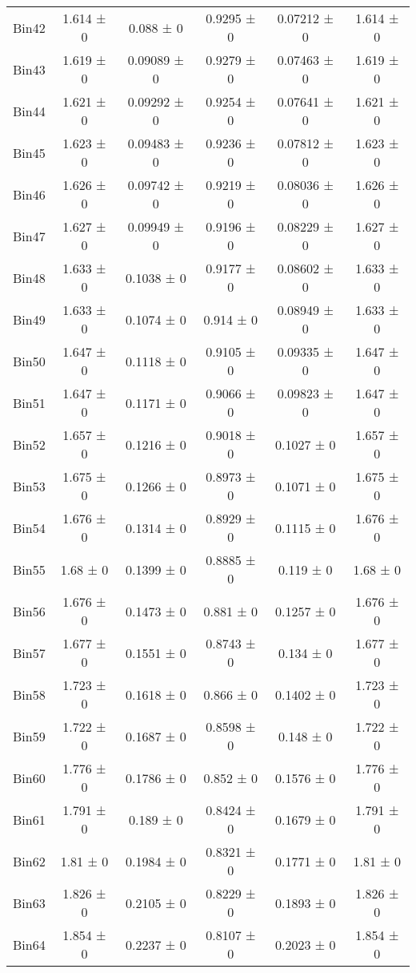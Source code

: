 \begin{tabular}{@{\extracolsep{4pt}}lccccc@{}}
     Bin42 & 1.614 ± 0 & 0.088 ± 0 & 0.9295 ± 0 & 0.07212 ± 0 & 1.614 ± 0 \\ 
     Bin43 & 1.619 ± 0 & 0.09089 ± 0 & 0.9279 ± 0 & 0.07463 ± 0 & 1.619 ± 0 \\ 
     Bin44 & 1.621 ± 0 & 0.09292 ± 0 & 0.9254 ± 0 & 0.07641 ± 0 & 1.621 ± 0 \\ 
     Bin45 & 1.623 ± 0 & 0.09483 ± 0 & 0.9236 ± 0 & 0.07812 ± 0 & 1.623 ± 0 \\ 
     Bin46 & 1.626 ± 0 & 0.09742 ± 0 & 0.9219 ± 0 & 0.08036 ± 0 & 1.626 ± 0 \\ 
     Bin47 & 1.627 ± 0 & 0.09949 ± 0 & 0.9196 ± 0 & 0.08229 ± 0 & 1.627 ± 0 \\ 
     Bin48 & 1.633 ± 0 & 0.1038 ± 0 & 0.9177 ± 0 & 0.08602 ± 0 & 1.633 ± 0 \\ 
     Bin49 & 1.633 ± 0 & 0.1074 ± 0 & 0.914 ± 0 & 0.08949 ± 0 & 1.633 ± 0 \\ 
     Bin50 & 1.647 ± 0 & 0.1118 ± 0 & 0.9105 ± 0 & 0.09335 ± 0 & 1.647 ± 0 \\ 
     Bin51 & 1.647 ± 0 & 0.1171 ± 0 & 0.9066 ± 0 & 0.09823 ± 0 & 1.647 ± 0 \\ 
     Bin52 & 1.657 ± 0 & 0.1216 ± 0 & 0.9018 ± 0 & 0.1027 ± 0 & 1.657 ± 0 \\ 
     Bin53 & 1.675 ± 0 & 0.1266 ± 0 & 0.8973 ± 0 & 0.1071 ± 0 & 1.675 ± 0 \\ 
     Bin54 & 1.676 ± 0 & 0.1314 ± 0 & 0.8929 ± 0 & 0.1115 ± 0 & 1.676 ± 0 \\ 
     Bin55 & 1.68 ± 0 & 0.1399 ± 0 & 0.8885 ± 0 & 0.119 ± 0 & 1.68 ± 0 \\ 
     Bin56 & 1.676 ± 0 & 0.1473 ± 0 & 0.881 ± 0 & 0.1257 ± 0 & 1.676 ± 0 \\ 
     Bin57 & 1.677 ± 0 & 0.1551 ± 0 & 0.8743 ± 0 & 0.134 ± 0 & 1.677 ± 0 \\ 
     Bin58 & 1.723 ± 0 & 0.1618 ± 0 & 0.866 ± 0 & 0.1402 ± 0 & 1.723 ± 0 \\ 
     Bin59 & 1.722 ± 0 & 0.1687 ± 0 & 0.8598 ± 0 & 0.148 ± 0 & 1.722 ± 0 \\ 
     Bin60 & 1.776 ± 0 & 0.1786 ± 0 & 0.852 ± 0 & 0.1576 ± 0 & 1.776 ± 0 \\ 
     Bin61 & 1.791 ± 0 & 0.189 ± 0 & 0.8424 ± 0 & 0.1679 ± 0 & 1.791 ± 0 \\ 
     Bin62 & 1.81 ± 0 & 0.1984 ± 0 & 0.8321 ± 0 & 0.1771 ± 0 & 1.81 ± 0 \\ 
     Bin63 & 1.826 ± 0 & 0.2105 ± 0 & 0.8229 ± 0 & 0.1893 ± 0 & 1.826 ± 0 \\ 
     Bin64 & 1.854 ± 0 & 0.2237 ± 0 & 0.8107 ± 0 & 0.2023 ± 0 & 1.854 ± 0 \\ 

\end{tabular}
